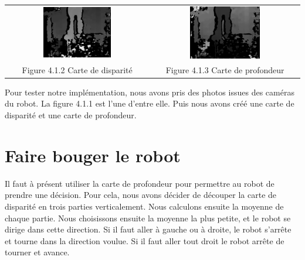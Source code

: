 \documentclass[12pt,a4paper]{report}
\begin{document}
\begin{center}
\begin{tabular}{cc}
  \vspace{0pt} \includegraphics[width=0.49\textwidth]{Carte_de_disparite.png} &
  \vspace{0pt} \includegraphics[width=0.49\textwidth]{Carte_de_profondeur.png} \\
    
	Figure 4.1.2 Carte de disparité & Figure 4.1.3 Carte de profondeur
\end{tabular}
\end{center}

Pour tester notre implémentation, nous avons pris des photos issues des caméras du robot. La figure 4.1.1 est l'une d'entre elle. Puis nous avons créé une carte de disparité et une carte de profondeur. 

\section{Faire bouger le robot}
Il faut à présent utiliser la carte de profondeur pour permettre au robot de prendre une décision. Pour cela, nous avons décider de découper la carte de disparité en trois parties verticalement. Nous calculons ensuite la moyenne de chaque partie. Nous choisissons ensuite la moyenne la plus petite, et le robot se dirige dans cette direction. Si il faut aller à gauche ou à droite, le robot s'arrête et tourne dans la direction voulue. Si il faut aller tout droit le robot arrête de tourner et avance.\\
\end{document}
